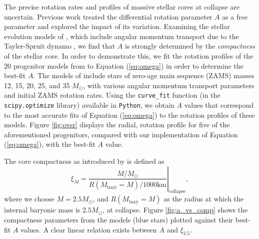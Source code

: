 \documentclass[twocolumn,times]{aastex62}  %
\begin{document}
The precise rotation rates and profiles of massive stellar cores at collapse are uncertain.
Previous work \citep[e.g.,][]{abdik:2014} treated the differential rotation parameter $A$ as a free parameter and explored the impact of its variation.
Examining the stellar evolution models of \citet{heger:2005}, which include angular momentum transport due to the Tayler-Spruit dynamo \citep{spruit:2002}, we find that $A$ is strongly determined by the {\it compactness} \citep{oconnor:2011} of the stellar core.
In order to demonstrate this, we fit the rotation profiles of the 20 progenitor models from \citet{heger:2005} to Equation (\ref{eq:omega}) in order to determine the best-fit $A$.
The models of \citet{heger:2005} include stars of zero-age main sequence (ZAMS) masses 12, 15, 20, 25, and 35 $M_{\odot}$, with various angular momentum transport parameters and initial ZAMS rotation rates.  
Using the \texttt{curve\_fit} function (in the \texttt{scipy.optimize} library) available in \texttt{Python}, we obtain $A$ values that correspond to the most accurate fits of Equation (\ref{eq:omega}) to the rotation profiles of these models.  Figure \ref{fig:ovsr} displays the radial, rotation profile for five of the aforementioned progenitors, compared with our implementation of Equation (\ref{eq:omega}), with the best-fit $A$ value.

The core compactness as introduced by \citet{oconnor:2011} is defined as
\begin{equation}
    \xi_M = \left.\frac{M/M_{\odot}}{R(M_\mathrm{bary}=M)/1000 \text{km}}\right\vert_\mathrm{collapse} ,
\end{equation} 
where we choose $M = 2.5 M_\odot$, and $R(M_{\mathrm{bary}}=M) $ as the radius at which the internal baryonic mass is $2.5M_\odot$, at collapse.  
Figure \ref{fig:a_vs_comp} shows the compactness parameters from the \citet{heger:2005} models (blue stars) plotted against their best-fit $A$ values.
A clear linear relation exists between $A$ and $\xi_{2.5}$.  
\end{document}
